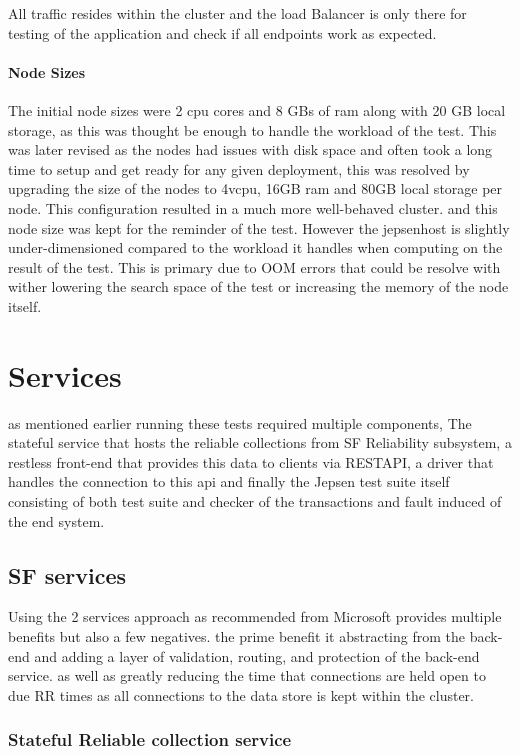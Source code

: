 \documentclass[a4paper,10pt,titlepage]{report}
\begin{document}
    All traffic resides within the cluster and the load Balancer is only there for testing of the application and check if all endpoints work as expected.

    \paragraph*{Node Sizes}

    The initial node sizes were 2 cpu cores and 8 GBs of ram along with 20 GB local storage, as this was thought be enough to handle the workload of the test. This was later revised as the nodes had issues with disk space and often took a long time to setup and get ready for any given deployment, this was resolved by upgrading the size of the nodes to 4vcpu, 16GB ram and 80GB local storage per node. This configuration resulted in a much more well-behaved cluster. and this node size was kept for the reminder of the test. However the jepsenhost is slightly under-dimensioned compared to the workload it handles when computing on the result of the test. This is primary due to OOM errors that could be resolve with wither lowering the search space of the test or increasing the memory of the node itself.


    \section{Services}
    as mentioned earlier running these tests required multiple components, The stateful service that hosts the reliable collections from SF Reliability subsystem, a restless front-end that provides this data to clients via RESTAPI, a driver that handles the connection to this api and finally the Jepsen test suite itself consisting of both test suite and checker of the transactions and fault induced of the end system.

    \subsection{SF services}
    Using the 2 services approach as recommended from Microsoft provides multiple benefits but also a few negatives. the prime benefit it abstracting from the back-end and adding a layer of validation, routing, and protection of the back-end service. as well as greatly reducing the time that connections are held open to due RR times as all connections to the data store is kept within the cluster.

    \subsubsection{Stateful Reliable collection service}
\end{document}
